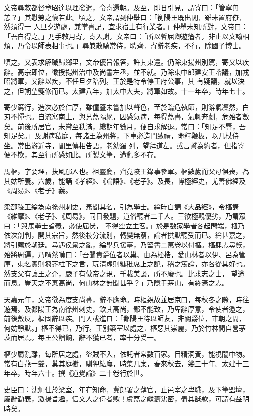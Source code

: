 \begin{pinyinscope}
 文帝尋敕都督章昭達以理發遣，令寄還朝。及至，即日引見，謂寄曰：「管寧無恙？」其慰勞之懷若此。頃之，文帝謂到仲舉曰：「衡陽王既出閣，雖未置府僚，然須得一
 人旦夕遊處，兼掌書記，宜求宿士有行業者。」仲舉未知所對，文帝曰：「吾自得之。」乃手敕用寄，寄入謝，文帝曰：「所以暫屈卿遊籓者，非止以文翰相煩，乃令以師表相事也。」尋兼散騎常侍，聘齊，寄辭老疾，不行，除國子博士。



 頃之，又表求解職歸鄉里，文帝優旨報答，許其東還。仍除東揚州別駕，寄又以疾辭。高宗即位，徵授揚州治中及尚書左丞，並不就。乃除東中郎建安王諮議，加戎昭將軍，又辭以疾，不任旦夕陪列。王於是特令停王府公事，其
 有疑議，就以決之，但朔望箋修而已。太建八年，加太中大夫，將軍如故。十一年卒，時年七十。



 寄少篤行，造次必於仁厚，雖僮豎未嘗加以聲色，至於臨危執節，則辭氣凜然，白刃不憚也。自流寓南土，與兄荔隔絕，因感氣病，每得荔書，氣輒奔劇，危殆者數矣。前後所居官，未嘗至秩滿，纔期年數月，便自求解退。常曰：「知足不辱，吾知足矣。」及謝病私庭，每諸王為州將，下車必造門致禮，命釋鞭板，以几杖侍坐。常出游近寺，閭里傳相告語，老幼羅
 列，望拜道左。或言誓為約者，但指寄便不欺，其至行所感如此。所製文筆，遭亂多不存。



 馬樞，字要理，扶風郿人也。祖靈慶，齊竟陵王錄事參軍。樞數歲而父母俱喪，為其姑所養。六歲，能誦《孝經》、《論語》、《老子》。及長，博極經史，尤善佛經及《周易》、《老子》義。



 梁邵陵王綸為南徐州刺史，素聞其名，引為學士。綸時自講《大品經》，令樞講《維摩》、《老子》、《周易》，同日發題，道俗聽者二千人。王欲極觀優劣，乃謂眾曰：「與馬學士論義，必使屈伏，
 不得空立主客。」於是數家學者各起問端，樞乃依次剖判，開其宗旨，然後枝分流別，轉變無窮，論者拱默聽受而已。綸甚嘉之，將引薦於朝廷。尋遇侯景之亂，綸舉兵援臺，乃留書二萬卷以付樞。樞肆志尋覽，殆將周遍，乃喟然嘆曰：「吾聞貴爵位者以巢、由為桎梏，愛山林者以伊、呂為管庫，束名實則芻芥柱下之言，玩清虛則糠秕席上之說，稽之篤論，亦各從其好也。然支父有讓王之介，嚴子有傲帝之規，千載美談，所不廢也。比求志之士，
 望途而息。豈天之不惠高尚，何山林之無聞甚乎？」乃隱于茅山，有終焉之志。



 天嘉元年，文帝徵為度支尚書，辭不應命。時樞親故並居京口，每秋冬之際，時往遊焉。及鄱陽王為南徐州刺史，欽其高尚，鄙不能致，乃卑辭厚意，令使者邀之，前後數反，樞固辭以疾。門人或進曰：「鄱陽王待以師友，非關爵位，市朝之間，何妨靜默。」樞不得已，乃行。王別築室以處之，樞惡其崇麗，乃於竹林間自營茅茨而居焉。每王公饋餉，辭不獲已者，率十分受一。



 樞少屬亂離，每所居之處，盜賊不入，依託者常數百家。目精洞黃，能視闇中物。常有白燕一雙，巢其庭樹，馴狎紘廡，時集几案，春來秋去，幾三十年。太建十三年卒，時年六十。撰《道覺論》二十卷行於世。



 史臣曰：沈炯仕於梁室，年在知命，冀郎署之薄官，止邑宰之卑職，及下筆盟壇，屬辭勸表，激揚旨趣，信文人之偉者歟！虞荔之獻籌沈密，盡其誠款，可謂有益明時矣。



\end{pinyinscope}